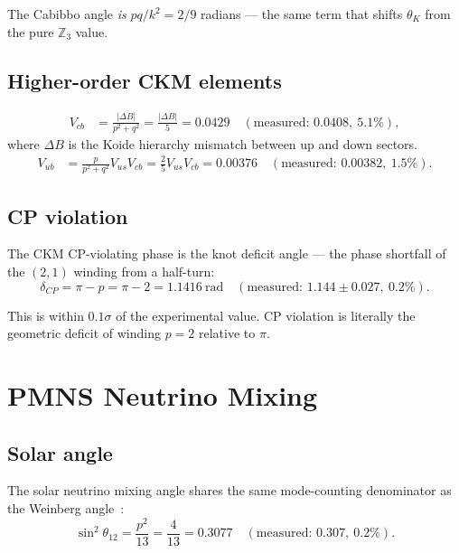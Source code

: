 \documentclass[11pt,a4paper]{article}
\begin{document}
The Cabibbo angle \emph{is} $pq/k^2 = 2/9$ radians --- the same term that shifts $\theta_K$ from the pure $\mathbb{Z}_3$ value.

\subsection{Higher-order CKM elements}

\begin{align}
  V_{cb} &= \frac{|\Delta B|}{p^2+q^2} = \frac{|\Delta B|}{5} = 0.0429 \quad (\text{measured: } 0.0408,\ 5.1\%), \label{eq:Vcb}
\end{align}
where $\Delta B$ is the Koide hierarchy mismatch between up and down sectors.
\begin{align}
  V_{ub} &= \frac{p}{p^2+q^2}V_{us}V_{cb} = \frac{2}{5}V_{us}V_{cb} = 0.00376 \quad (\text{measured: } 0.00382,\ 1.5\%). \label{eq:Vub}
\end{align}

\subsection{CP violation}

The CKM CP-violating phase is the knot deficit angle --- the phase shortfall of the $(2,1)$ winding from a half-turn:
\begin{equation}
  \delta_{CP} = \pi - p = \pi - 2 = 1.1416~\text{rad} \quad (\text{measured: } 1.144 \pm 0.027,\ 0.2\%).
  \label{eq:cp-phase}
\end{equation}

This is within $0.1\sigma$ of the experimental value. CP violation is literally the geometric deficit of winding $p = 2$ relative to $\pi$.

\section{PMNS Neutrino Mixing}
\label{sec:pmns}

\subsection{Solar angle}

The solar neutrino mixing angle shares the same mode-counting denominator as the Weinberg angle~\cite{nufit2020}:
\begin{equation}
  \sin^2\theta_{12} = \frac{p^2}{13} = \frac{4}{13} = 0.3077 \quad (\text{measured: } 0.307,\ 0.2\%).
  \label{eq:solar}
\end{equation}
\end{document}
